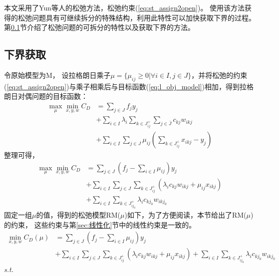 本文采用了Yun等人\cite{YUN2020}的松弛方法，松弛约束(\ref{eq:st_assign2open})。
使用该方法获得的松弛问题具有可继续拆分的特殊结构，利用此特性可以加快获取下界的过程。
第\ref{subsec:下界获取}节介绍了松弛问题的可拆分的特性以及获取下界的方法。

\subsection{下界获取}
\label{subsec:下界获取}
令原始模型为M，
设拉格朗日乘子$\mu = \{ \mu_{ij}\ge 0 | \forall i \in I , j \in J\}$，并将松弛的约束(\ref{eq:st_assign2open})与乘子相乘后与目标函数(\ref{eq:l_obj_model})相加，得到拉格朗日对偶问题的目标函数：
\begin{equation}
\begin{split}
\max_{\mu}\min_{x,y,w} C_D &= \sum_{j\in J}f_jy_j \\
&+ \sum_{i\in I}\lambda_i \sum_{k\in J_{ij}^+}\sum_{j\in \bar{J}} c_{kj} w_{ikj} \\
&+\sum_{i\in I}\sum_{j\in J}\mu_{ij}\left(\sum_{k\in J_{ij}^+}x_{ikj} -y_j \right)  
\end{split}
\end{equation}
整理可得，
\begin{equation}
\begin{split}
  \max_{\mu}\min_{x,y,w} C_D &= \sum_{j\in J} (f_j - \sum_{i\in I} \mu_{ij}) y_j \\
&+ \sum_{i\in I} \sum_{j\in J} \sum_{k\in J_{ij}^+} (\lambda_i c_{kj} w_{ikj} + \mu_{ij} x_{ikj}) \\
&+ \sum_{i\in I} \sum_{k\in J_{ij_0}^+}\lambda_i c_{kj_0} w_{ikj_0}  
\end{split}
\label{lag_obj}
\end{equation}
固定一组$\mu$的值，得到的松弛模型RM($\mu$)如下，为了方便阅读，本节给出了RM($\mu$)的约束，
这些约束与第\ref{sec:线性化}节中的线性约束是一致的。
\begin{equation}
\begin{split}
\min_{x,y,w} C_D(\mu) &= \sum_{j\in J} (f_j - \sum_{i\in I} \mu_{ij}) y_j \\
&+ \sum_{i\in I} \sum_{j\in J} \sum_{k\in J_{ij}^+} (\lambda_i c_{kj} w_{ikj} + \mu_{ij} x_{ikj}) 
+ \sum_{i\in I} \sum_{k\in J_{ij_0}^+}\lambda_i c_{kj_0} w_{ikj_0}  
\end{split}
\label{eq:rm_obj}
\end{equation}
\textit{s.t.}
